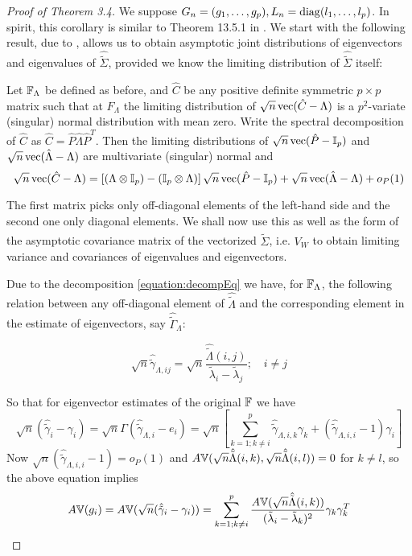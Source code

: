 \begin{proof}[Proof of Theorem 3.4]
We suppose $G_n = (g_1, \ldots, g_p), L_n = \operatorname*{diag}(l_1, \ldots, l_p)$. In spirit, this corollary is similar to Theorem 13.5.1 in \cite{ref:AndersonBook09}. We start with the following result, due to \citep{ref:SPL12765_Taskinenetal}, allows us to obtain asymptotic joint distributions of eigenvectors and eigenvalues of $\hat{\tilde \Sigma}$, provided we know the limiting distribution of $\hat{\tilde \Sigma}$ itself:

\begin{Theorem} \label{Theorem:decomp} 
Let ${\mathbb{F}}_\Lambda$ be defined as before, and $\hat C$ be any positive definite symmetric $p \times p$ matrix such that at $F_\Lambda$ the limiting distribution of $\sqrt n \operatorname*{vec}(\hat C - \Lambda)$ is a $p^2$-variate (singular) normal distribution with mean zero. Write the spectral decomposition of $\hat C$ as $\hat C = \hat P \hat\Lambda \hat P^T$. Then the limiting distributions of $\sqrt n \operatorname*{vec}(\hat P - {\mathbb{I}}_p)$ and $\sqrt n \operatorname*{vec}( \hat\Lambda - \Lambda)$ are multivariate (singular) normal and
%
\begin{equation} \label{equation:decompEq}
\sqrt n \operatorname*{vec} (\hat C - \Lambda)  = \left[ (\Lambda \otimes {\mathbb{I}}_p) - ({\mathbb{I}}_p \otimes \Lambda) \right] \sqrt n \operatorname*{vec} (\hat P - {\mathbb{I}}_p) + \sqrt n \operatorname*{vec} (\hat \Lambda - \Lambda) + o_P(1)
\end{equation}
\end{Theorem}

The first matrix picks only off-diagonal elements of the left-hand side and the second one only diagonal elements. We shall now use this as well as the form of the asymptotic covariance matrix of the vectorized $\hat {\tilde \Sigma}$, i.e. $V_W$ to obtain limiting variance and covariances of eigenvalues and eigenvectors.

Due to the decomposition \eqref{equation:decompEq} we have, for ${\mathbb{F}}_\Lambda$, the following relation between any off-diagonal element of $\hat{\tilde \Lambda}$ and the corresponding element in the estimate of eigenvectors, say $\hat {\tilde \Gamma}_\Lambda$:

$$ \sqrt n \hat {\tilde \gamma}_{\Lambda, ij} = \sqrt n \frac{\hat {\tilde \Lambda} (i,j) }{\tilde \lambda_i - \tilde \lambda_j}; \quad i \neq j$$

So that for eigenvector estimates of the original ${\mathbb{F}}$ we have
%
\begin{equation}\label{equation:app1}
\sqrt n ( \hat{\tilde \gamma}_{i} - \gamma_i) =
\sqrt n \Gamma ( \hat {\tilde \gamma}_{\Lambda, i} - e_i ) =
\sqrt n \left[ \sum_{k=1; k \neq i}^p \hat {\tilde \gamma}_{\Lambda,i,k} \gamma_k + (\hat {\tilde \gamma}_{\Lambda,i,i} - 1) \gamma_i \right]
\end{equation}
%
Now $\sqrt n (\hat {\tilde \gamma}_{\Lambda,i,i} - 1) =  o_P(1)$ and $A{\mathbb{V}}(\sqrt n \hat {\tilde \Lambda} (i,k), \sqrt n \hat {\tilde \Lambda} (i,l) ) = 0$ for $k \neq l$, so the above equation implies
%
$$ A{\mathbb{V}}(g_i) = A {\mathbb{V}} (\sqrt n ( \hat{\tilde \gamma}_{i} - \gamma_i)) = \sum_{k=1; k \neq i}^p \frac{A{\mathbb{V}}(\sqrt n \hat {\tilde \Lambda} (i,k))}{(\tilde \lambda_i - \tilde \lambda_k)^2} \gamma_k \gamma_k^T $$
%


\end{proof}
